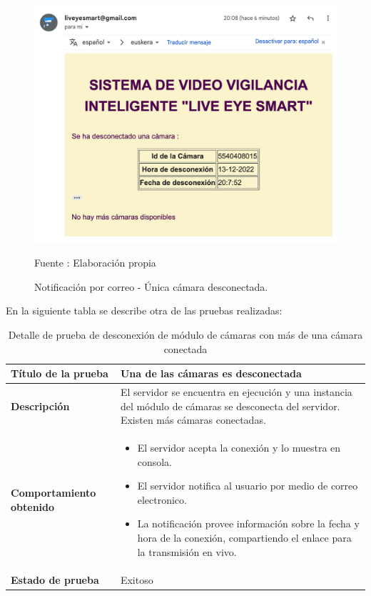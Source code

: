 \begin{figure}[H]
    \begin{center}
        \includegraphics[width=12cm]{img/capitulo_6/mail4.png}
    \end{center}
    \begin{center}
        \caption{Notificación por correo - Única cámara desconectada.}
        Fuente : Elaboración propia
    \end{center}
\end{figure}

En la siguiente tabla se describe otra de las pruebas realizadas:\\

\begin{table}[H]
    \caption{Detalle de prueba de desconexión de módulo de cámaras con más de una cámara conectada}
    \begin{center}
        \begin{tabular}{|>{\centering}p{}|m{}<{\centering}|} 
            \hline
            \textbf{Título de la prueba} & Una de las cámaras es desconectada \\
            \hline
            \textbf{Descripción} & El servidor se encuentra en ejecución y una instancia del módulo de cámaras se desconecta del servidor. Existen más cámaras conectadas.\\
            \hline
            \textbf{Comportamiento obtenido} & 
            \begin{itemize}
                \item El servidor acepta la conexión y lo muestra en consola.
                \item El servidor notifica al usuario por medio de correo electronico.
                \item La notificación provee información sobre la fecha y hora de la conexión, compartiendo el enlace para la transmisión en vivo.
            \end{itemize} \\ 
            \hline
            \textbf{Estado de prueba} & Exitoso \\
            \hline
        \end{tabular}
    \end{center}
\end{table}

